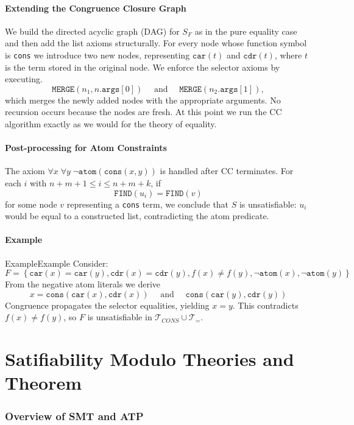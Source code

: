 \documentclass[a4paper]{article}
\theoremstyle{definition}
\begin{document}
\subsection{Extending the Congruence Closure Graph}
We build the directed acyclic graph (DAG) for \( S_F \) as in the pure equality case and then add the list axioms 
structurally. For every node whose function symbol is \texttt{cons} we introduce two new nodes, representing \( \texttt{car}(t) \) and 
\( \texttt{cdr}(t) \), where \( t \) is the term stored in the original node. We enforce the selector 
axioms by executing.
\[
  \texttt{MERGE}(n_1, n.\texttt{args}[0]) \quad \text{ and } \quad \texttt{MERGE}(n_2.\texttt{args}[1]),
\]
which merges the newly added nodes with the appropriate arguments. No recursion occurs because the nodes are fresh.
At this point we run the CC algorithm exactly as we would for the theory of equality.
\subsection{Post-processing for Atom Constraints}
The axiom \( \forall x\; \forall y\; \lnot \texttt{atom}(\texttt{cons}(x,y)) \) is handled after CC terminates. For each 
\( i \) with \( n + m + 1 \leq i \leq n + m + k \), if 
\[
  \texttt{FIND}(u_i) = \texttt{FIND}(v)
\]
for some node \( v \) representing a \texttt{cons} term, we conclude that \( S \) is unsatisfiable: \( u_i \) would be 
equal to a constructed list, contradicting the atom predicate.
\subsection{Example}
\begin{example}{Example}{Example}
Consider:
\[
	F = \left\{ \texttt{car}(x) = \texttt{car}(y), \texttt{cdr}(x) = \texttt{cdr}(y), f(x) \neq f(y), \lnot \texttt{atom}(x), \lnot \texttt{atom}(y) \right\}
\]
From the negative atom literals we derive 
\[
  x = \texttt{cons}(\texttt{car}(x), \texttt{cdr}(x)) \quad \text{ and } \quad \texttt{cons}(\texttt{car}(y), \texttt{cdr}(y))
\]
Congruence propagates the selector equalities, yielding \( x = y \). This contradicts \( f(x) \neq f(y) \), so \( F \) is unsatisfiable in 
\( \mathcal{T}_{CONS} \cup \mathcal{T}_{=} \).
\end{example}
\part{Satifiability Modulo Theories and Theorem}
\section{Overview of SMT and ATP}
\end{document}
